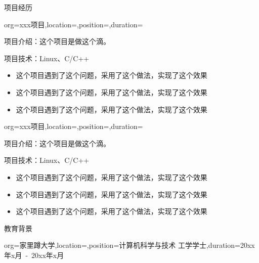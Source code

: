\documentclass{resume}
\begin{document}
\begin{ResumeSection}{项目经历}
    \begin{ResumeSubsection}{org={xxx项目},location={},position={},duration={}}
        \par\normalsize{项目介绍：}{这个项目是做这个滴。}
        \par\normalsize{项目技术：}{Linux、C/C++}
        \begin{itemize}
            \item {这个项目遇到了这个问题，采用了这个做法，实现了这个效果}
            \item {这个项目遇到了这个问题，采用了这个做法，实现了这个效果}
            \item {这个项目遇到了这个问题，采用了这个做法，实现了这个效果}
        \end{itemize}
    \end{ResumeSubsection}

    \begin{ResumeSubsection}{org={xxx项目},location={},position={},duration={}}
        \par\normalsize{项目介绍：}{这个项目是做这个滴。}
        \par\normalsize{项目技术：}{Linux、C/C++}
        \begin{itemize}
            \item {这个项目遇到了这个问题，采用了这个做法，实现了这个效果}
            \item {这个项目遇到了这个问题，采用了这个做法，实现了这个效果}
            \item {这个项目遇到了这个问题，采用了这个做法，实现了这个效果}
        \end{itemize}
    \end{ResumeSubsection}
\end{ResumeSection}

\begin{ResumeSection}{教育背景}
    \begin{ResumeSubsection}{org={家里蹲大学},location={},position={计算机科学与技术 \qquad 工学学士},duration={20xx年x月\ -\ 20xx年x月}}
    \end{ResumeSubsection}
\end{ResumeSection}
\end{document}
